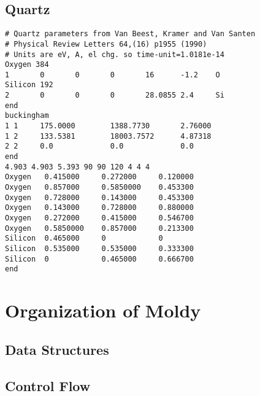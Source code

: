 \documentclass[twoside]{report}
\begin{document}
\section{Quartz}%
\begin{verbatim}
# Quartz parameters from Van Beest, Kramer and Van Santen
# Physical Review Letters 64,(16) p1955 (1990)
# Units are eV, A, el chg. so time-unit=1.0181e-14
Oxygen 384
1       0       0       0       16      -1.2    O
Silicon 192
2       0       0       0       28.0855 2.4     Si
end
buckingham
1 1     175.0000        1388.7730       2.76000
1 2     133.5381        18003.7572      4.87318
2 2     0.0             0.0             0.0
end
4.903 4.903 5.393 90 90 120 4 4 4
Oxygen   0.415000     0.272000     0.120000
Oxygen   0.857000     0.5850000    0.453300
Oxygen   0.728000     0.143000     0.453300
Oxygen   0.143000     0.728000     0.880000
Oxygen   0.272000     0.415000     0.546700
Oxygen   0.5850000    0.857000     0.213300
Silicon  0.465000     0            0
Silicon  0.535000     0.535000     0.333300
Silicon  0            0.465000     0.666700
end
\end{verbatim}
\chapter{Organization of Moldy} %
\section{Data Structures}%
\label{sec:structs}
\section{Control Flow}%
\end{document}
